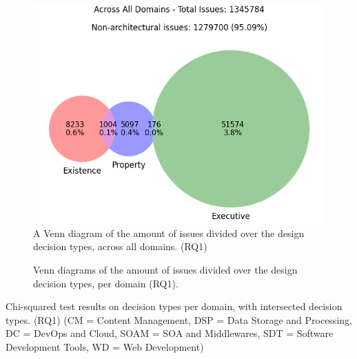 \documentclass[10pt,a4paper,twocolumn]{article}
\begin{document}
\begin{figure}[h]
    \centering
    \includegraphics[width=\linewidth]{rq1/total_counts_high_conf.png}
    \caption{A Venn diagram of the amount of issues divided over the design decision types, across all domains. (RQ1)}
    \label{fig:rq1_totals}
  \end{figure}

\begin{figure}[!th]
    \centering
    
    
      
    \caption{Venn diagrams of the amount of issues divided over the design decision types, per domain (RQ1).}
    \label{fig:rq1_domainspecific}
\end{figure}

\begin{table}[]
    \centering

    \caption{Chi-squared test results on decision types per domain, with intersected decision types. (RQ1) (CM = Content Management, DSP = Data Storage and Processing, DC = DevOps and Cloud, SOAM = SOA and Middlewares, SDT = Software Development Tools, WD = Web Development)}
    \label{table:rq1_intersected}
\end{table}
\end{document}

